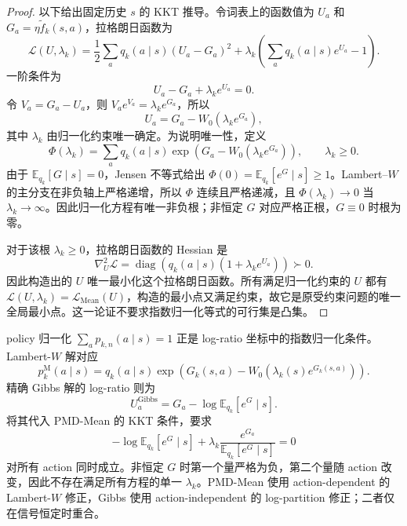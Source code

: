 \documentclass[lang=cn,scheme=chinese,openany]{../book/elegantbook}
\begin{document}
\begin{proof}
以下给出固定历史 $s$ 的 KKT 推导。令词表上的函数值为 $U_a$ 和 $G_a=\eta\widetilde f_k(s,a)$，拉格朗日函数为
\begin{equation*}
\mathscr L(U,\lambda_k)
=\frac12\sum_a q_k(a\mid s)(U_a-G_a)^2
+\lambda_k\left(\sum_a q_k(a\mid s)e^{U_a}-1\right).
\end{equation*}
一阶条件为
\begin{equation*}
U_a-G_a+\lambda_k e^{U_a}=0.
\end{equation*}
令 $V_a=G_a-U_a$，则 $V_a e^{V_a}=\lambda_k e^{G_a}$，所以
\begin{equation}
\label{eq:ch2-mean-lambert}
U_a=G_a-W_0\!\left(\lambda_k e^{G_a}\right),
\end{equation}
其中 $\lambda_k$ 由归一化约束唯一确定。为说明唯一性，定义
\begin{equation*}
\Phi(\lambda_k)=\sum_a q_k(a\mid s)\exp\!\left(G_a-W_0(\lambda_k e^{G_a})\right),\qquad \lambda_k\geq0.
\end{equation*}
由于 $\mathbb E_{ q_k}[G\mid s]=0$，Jensen 不等式给出
$\Phi(0)=\mathbb E_{ q_k}[e^G\mid s]\ge1$。Lambert--$W$ 的主分支在非负轴上严格递增，所以 $\Phi$ 连续且严格递减，且 $\Phi(\lambda_k)\to0$ 当 $\lambda_k\to\infty$。因此归一化方程有唯一非负根；非恒定 $G$ 对应严格正根，$G\equiv0$ 时根为零。

对于该根 $\lambda_k\ge0$，拉格朗日函数的 Hessian 是
\begin{equation*}
\nabla_U^2\mathscr L
=\operatorname{diag}\!\left( q_k(a\mid s)(1+\lambda_k e^{U_a})\right)\succ0.
\end{equation*}
因此构造出的 $U$ 唯一最小化这个拉格朗日函数。所有满足归一化约束的 $U$ 都有 $\mathscr L(U,\lambda_k)=\mathcal L_{\mathrm{Mean}}(U)$，构造的最小点又满足约束，故它是原受约束问题的唯一全局最小点。这一论证不要求指数归一化等式的可行集是凸集。
\end{proof}

policy 归一化 $\sum_a p_{k,n}(a\mid s)=1$ 正是 log-ratio 坐标中的指数归一化条件。Lambert-$W$ 解对应
\begin{equation*}
 p_k^{\mathrm M}(a\mid s)
= q_k(a\mid s)\exp\!\left(G_k(s,a)-W_0(\lambda_k(s)e^{G_k(s,a)})\right).
\end{equation*}
精确 Gibbs 解的 log-ratio 则为
\begin{equation*}
U_a^{\mathrm{Gibbs}}=G_a-\log\mathbb E_{ q_k}[e^G\mid s].
\end{equation*}
将其代入 PMD-Mean 的 KKT 条件，要求
\begin{equation*}
-\log\mathbb E_{ q_k}[e^G\mid s]
+\lambda_k\frac{e^{G_a}}{\mathbb E_{ q_k}[e^G\mid s]}=0
\end{equation*}
对所有 action 同时成立。非恒定 $G$ 时第一个量严格为负，第二个量随 action 改变，因此不存在满足所有方程的单一 $\lambda_k$。PMD-Mean 使用 action-dependent 的 Lambert-$W$ 修正，Gibbs 使用 action-independent 的 log-partition 修正；二者仅在信号恒定时重合。
\end{document}

